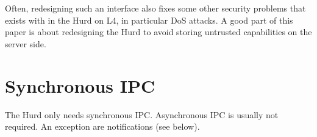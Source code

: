 Often, redesigning such an interface also fixes some other security
problems that exists with in the Hurd on L4, in particular DoS
attacks.  A good part of this paper is about redesigning the Hurd to
avoid storing untrusted capabilities on the server side.

\begin{comment}
  Examples are:

  \begin{itemize}
  \item The new authentication protocol, which eliminates the need for
    a rendezvous port and is not only faster, but also does not
    require the server to block on the client anymore (see section
    \ref{auth} on page \pageref{auth}).
    
  \item The signal handling, which does not require the \texttt{proc}
    server to hold the signal port for every task anymore (see section
    \ref{signals} on page \pageref{signals}).
    
  \item The new exec protocol, which eliminates the need to pass all
    capabilities that need to be transfered to the new executable from
    the old program to the filesystem server, and then to the
    \texttt{exec} server (see section \ref{exec} on page
    \pageref{exec}).
    
  \item The new way to implement Unix Domain Sockets, which don't
    require a trusted system server, so that descriptor passing (which
    is really capability passing) can work (see section
    \ref{unixdomainsockets} on page \pageref{unixdomainsockets}.

  \item The way parent and child filesystem are linked to each other,
    in other words: how mounting a filesystem works (see section
    \ref{xfslookup} on page \pageref{xfslookup}).
    
  \item The replacement for the \verb/file_reparent()/ RPC (see
    section \ref{reparenting} on page \pageref{reparenting}).
  \end{itemize}
\end{comment}

\section{Synchronous IPC}

The Hurd only needs synchronous IPC.  Asynchronous IPC is usually not
required.  An exception are notifications (see below).

